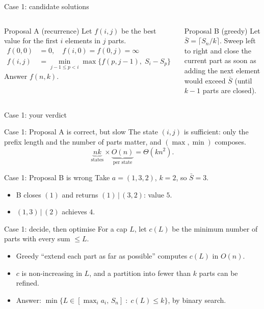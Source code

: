 \begin{frame}{Case 1: candidate solutions}
	\begin{columns}[T,onlytextwidth]
		\begin{block}{Proposal A (recurrence)}
			\small
			Let $f(i,j)$ be the best value for the first $i$ elements in $j$ parts.
			\begin{align*}
				f(0,0)&=0, \quad f(i,0)=f(0,j)=\infty\\
				f(i,j)&=\min_{j-1\le p<i}\max\bigl\{f(p,j-1),\;S_i-S_p\bigr\}
			\end{align*}
			Answer $f(n,k)$.
		\end{block}

		\begin{block}{Proposal B (greedy)}
			\small
			Let $\bar S=\lceil S_n/k\rceil$. Sweep left to right and close the current part
			as soon as adding the next element would exceed $\bar S$ (until $k-1$ parts are closed).
		\end{block}
	\end{columns}
\end{frame}

\begin{frame}{Case 1: your verdict}
\end{frame}

\begin{frame}{Case 1: Proposal A is correct, but slow}
	The state $(i,j)$ is sufficient: only the prefix length and the number of parts matter,
	and $(\max,\min)$ composes.
	\[
		\underbrace{nk}_{\text{states}}\times\underbrace{O(n)}_{\text{per state}}=\Theta(kn^2).
	\]
\end{frame}

\begin{frame}{Case 1: Proposal B is wrong}
	Take $a=(1,3,2)$, $k=2$, so $\bar S=3$.
	\begin{itemize}
		\item B closes $(1)$ and returns $(1)\,|\,(3,2)$: value $5$.
		\item $(1,3)\,|\,(2)$ achieves $4$.
	\end{itemize}
\end{frame}

\begin{frame}{Case 1: decide, then optimise}
	For a cap $L$, let $c(L)$ be the minimum number of parts with every sum $\le L$.
	\begin{itemize}
		\item Greedy ``extend each part as far as possible'' computes $c(L)$ in $O(n)$.
		\item $c$ is non-increasing in $L$, and a partition into fewer than $k$ parts can be refined.
		\item Answer: $\min\{L\in[\max_i a_i,\,S_n]\;:\;c(L)\le k\}$, by binary search.
	\end{itemize}
\end{frame}

